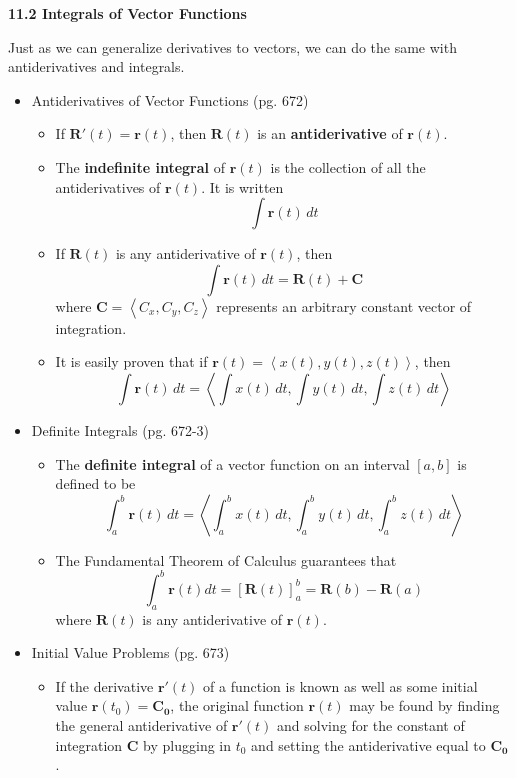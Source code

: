 \documentclass[12pt]{article}
\theoremstyle{plain}
\theoremstyle{definition}
\theoremstyle{remark}
\newcommand{\vect}[1]{\mathbf{#1}}
\newcommand{\dvar}[1]{\,d{#1}}
\begin{document}
	\newpage
	
	\centerline{\bf 11.2 Integrals of Vector Functions}
	
	Just as we can generalize derivatives to vectors, we can do the same with antiderivatives and integrals.
	
		\begin{itemize}
		\item Antiderivatives of Vector Functions (pg. 672)
			\begin{itemize}
			\item If $\vect{R}'(t)=\vect{r}(t)$, then $\vect{R}(t)$ is an \textbf{antiderivative} of $\vect{r}(t)$.
			\item The \textbf{indefinite integral} of $\vect{r}(t)$ is the collection of all the antiderivatives of $\vect{r}(t)$. It is written \[\int \vect{r}(t) \dvar{t}\]
			\item If $\vect{R}(t)$ is any antiderivative of $\vect{r}(t)$, then \[\int \vect{r}(t) \dvar{t} = \vect{R}(t) + \vect{C}\] where $\vect{C}=\left<C_x,C_y,C_z\right>$ represents an arbitrary constant vector of integration.
			\item It is easily proven that if $\vect{r}(t) = \left<x(t),y(t),z(t)\right>$, then \[\int \vect{r}(t) \dvar{t} = \left<\int x(t) \dvar{t}, \int y(t) \dvar{t}, \int z(t) \dvar{t} \right> \]
			\end{itemize}
		\item Definite Integrals (pg. 672-3)
			\begin{itemize}
			\item The \textbf{definite integral} of a vector function on an interval $[a,b]$ is defined to be \[\int^b_a \vect{r}(t) \dvar{t} = \left<\int^b_a x(t) \dvar{t}, \int^b_a y(t) \dvar{t}, \int^b_a z(t) \dvar{t} \right> \]
			\item The Fundamental Theorem of Calculus guarantees that \[\int^b_a \vect{r}(t)dt = \left[\vect{R}(t)\right]^b_a=\vect{R}(b)-\vect{R}(a)\] where $\vect{R}(t)$ is any antiderivative of $\vect{r}(t)$.
			\end{itemize}
			
		\item Initial Value Problems (pg. 673)
			\begin{itemize}
			\item If the derivative $\vect{r}'(t)$ of a function is known as well as some initial value $\vect{r}(t_0) = \vect{C_0}$, the original function $\vect{r}(t)$ may be found by finding the general antiderivative of $\vect{r}'(t)$ and solving for the constant of integration $\vect{C}$ by plugging in $t_0$ and setting the antiderivative equal to $\vect{C_0}$.
			\end{itemize}
		

\end{itemize}
\end{document}
